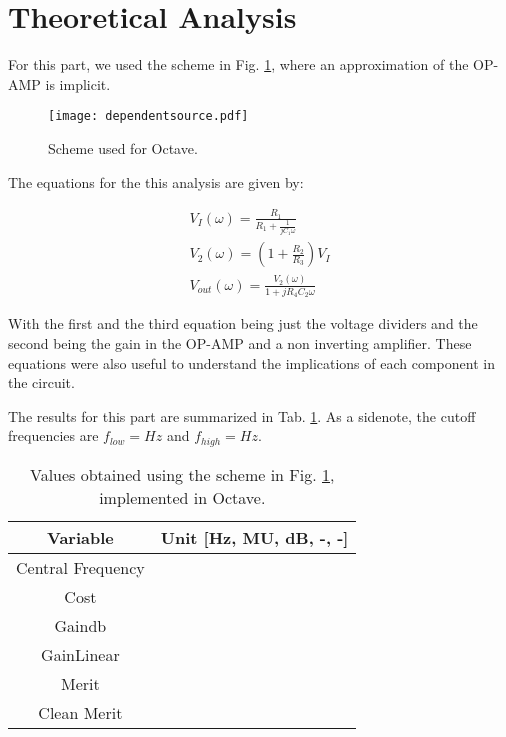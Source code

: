\section{Theoretical Analysis}

For this part, we used the scheme in Fig. \ref{fig:joaoscheme}, where an approximation of the OP-AMP is implicit.

\begin{figure}[H]
    \centering
    \texttt{[image: dependentsource.pdf]}
    \caption{Scheme used for Octave.}
    \label{fig:joaoscheme}
\end{figure}

The equations for the this analysis are given by:

\begin{gather}
 V_I(\omega) = \frac{R_1}{R_1+\frac{1}{jC_1\omega}} \\
 V_2(\omega) = \left(1+\frac{R_2}{R_3} \right)V_I\\
 V_{out}(\omega) = \frac{V_2(\omega)}{1+jR_4C_2\omega}
\end{gather}

With the first and the third equation being just the voltage dividers and the second being the gain in the OP-AMP and a non inverting amplifier. These equations were also useful to understand the implications of each component in the circuit.

The results for this part are summarized in Tab. \ref{tab:valuesoctave}. As a sidenote, the cutoff frequencies are $f_{low} = Hz$ and $f_{high} = Hz$.

\begin{table}[H]
    \centering
    \begin{tabular}{|c|c|}
        \hline
        Variable & Unit [Hz, MU, dB, -, -]\\ 
        \hline
        Central Frequency & \\
        \hline
        Cost & \\
        \hline
        Gaindb & \\
        \hline
        GainLinear & \\
        \hline
        Merit & \\
        \hline
        Clean Merit & \\
        \hline
    \end{tabular}
    \caption{Values obtained using the scheme in Fig. \ref{fig:joaoscheme}, implemented in Octave.}
    \label{tab:valuesoctave}
\end{table}

